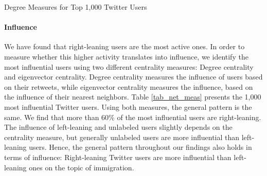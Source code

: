         \begin{table}[!htb]
                \centering
                
                
                
                \caption{Degree Measures for Top 1,000 Twitter Users}
                
                
                \label{tab_net_measure_volume}
            \end{table}
        


    \paragraph{Influence}

        We have found that right-leaning users %
        are the most active ones. In order to measure whether this higher activity translates into influence, we identify the most influential users using two different centrality measures: Degree centrality and eigenvector centrality. Degree centrality measures the influence of users based on their retweets, while eigenvector centrality measures the influence, based on the influence of their nearest neighbors. Table \ref{tab_net_meas} presents the 1,000 most influential Twitter users. Using both measures, the general pattern is the same. We find that more than 60\% of the most influential users are right-leaning. The influence of left-leaning and unlabeled users slightly depends on the centrality measure, but generally unlabeled users are more influential than left-leaning users. Hence, the general pattern throughout our findings also holds in terms of influence: Right-leaning Twitter users are more influential than left-leaning ones on the topic of immigration.


